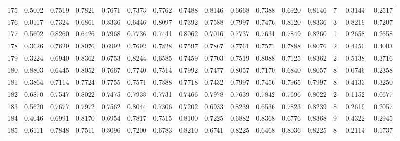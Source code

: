 \begin{tabular}{lrrrrrrrrrrrrrrr}
175 &      0.5002 &  0.7519 &  0.7821 &  0.7671 &  0.7373 &  0.7762 &  0.7488 &  0.8146 &  0.6668 &  0.7388 &   0.6920 &     0.8146 &      7 &                    0.3144 &                     0.2517 \\
176 &      0.0117 &  0.7324 &  0.6861 &  0.8336 &  0.6446 &  0.8097 &  0.7392 &  0.7588 &  0.7997 &  0.7476 &   0.8120 &     0.8336 &      3 &                    0.8219 &                     0.7207 \\
177 &      0.5602 &  0.8260 &  0.6426 &  0.7968 &  0.7736 &  0.7441 &  0.8062 &  0.7016 &  0.7737 &  0.7634 &   0.7849 &     0.8260 &      1 &                    0.2658 &                     0.2658 \\
178 &      0.3626 &  0.7629 &  0.8076 &  0.6992 &  0.7692 &  0.7828 &  0.7597 &  0.7867 &  0.7761 &  0.7571 &   0.7888 &     0.8076 &      2 &                    0.4450 &                     0.4003 \\
179 &      0.3224 &  0.6940 &  0.8362 &  0.6753 &  0.8244 &  0.6585 &  0.7459 &  0.7703 &  0.7519 &  0.8088 &   0.7125 &     0.8362 &      2 &                    0.5138 &                     0.3716 \\
180 &      0.8803 &  0.6445 &  0.8052 &  0.7667 &  0.7740 &  0.7514 &  0.7992 &  0.7477 &  0.8057 &  0.7170 &   0.6840 &     0.8057 &      8 &                   -0.0746 &                    -0.2358 \\
181 &      0.3864 &  0.7114 &  0.7724 &  0.7755 &  0.7571 &  0.7888 &  0.7718 &  0.7432 &  0.7997 &  0.7456 &   0.7965 &     0.7997 &      8 &                    0.4133 &                     0.3250 \\
182 &      0.6870 &  0.7547 &  0.8022 &  0.7475 &  0.7938 &  0.7731 &  0.7466 &  0.7978 &  0.7639 &  0.7842 &   0.7696 &     0.8022 &      2 &                    0.1152 &                     0.0677 \\
183 &      0.5620 &  0.7677 &  0.7972 &  0.7562 &  0.8044 &  0.7306 &  0.7202 &  0.6933 &  0.8239 &  0.6536 &   0.7823 &     0.8239 &      8 &                    0.2619 &                     0.2057 \\
184 &      0.4046 &  0.6991 &  0.8170 &  0.6954 &  0.7817 &  0.7515 &  0.8100 &  0.7225 &  0.6882 &  0.8368 &   0.6776 &     0.8368 &      9 &                    0.4322 &                     0.2945 \\
185 &      0.6111 &  0.7848 &  0.7511 &  0.8096 &  0.7200 &  0.6783 &  0.8210 &  0.6741 &  0.8225 &  0.6468 &   0.8036 &     0.8225 &      8 &                    0.2114 &                     0.1737 \\

\end{tabular}
